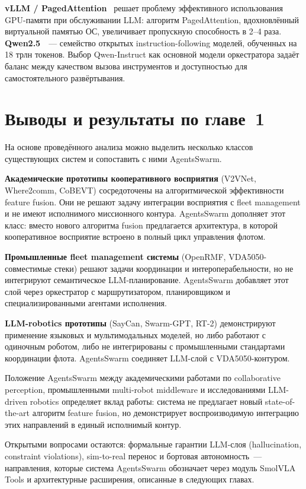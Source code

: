 \documentclass[14pt,a4paper]{extreport}
\begin{document}
\textbf{vLLM / PagedAttention}~\cite{kwon2023vllm} решает проблему эффективного использования GPU-памяти при обслуживании LLM: алгоритм PagedAttention, вдохновлённый виртуальной памятью ОС, увеличивает пропускную способность в 2--4 раза. \textbf{Qwen2.5}~\cite{qwen2025}~--- семейство открытых instruction-following моделей, обученных на 18 трлн токенов. Выбор Qwen-Instruct как основной модели оркестратора задаёт баланс между качеством вызова инструментов и доступностью для самостоятельного развёртывания.

\section{Выводы и результаты по главе~1}

На основе проведённого анализа можно выделить несколько классов существующих систем и сопоставить с ними AgentsSwarm.

\textbf{Академические прототипы кооперативного восприятия} (V2VNet, Where2comm, CoBEVT) сосредоточены на алгоритмической эффективности feature fusion. Они не решают задачу интеграции восприятия с fleet management и не имеют исполнимого миссионного контура. AgentsSwarm дополняет этот класс: вместо нового алгоритма fusion предлагается архитектура, в которой кооперативное восприятие встроено в полный цикл управления флотом.

\textbf{Промышленные fleet management системы} (OpenRMF, VDA5050-совместимые стеки) решают задачи координации и интероперабельности, но не интегрируют семантическое LLM-планирование. AgentsSwarm добавляет этот слой через оркестратор с маршрутизатором, планировщиком и специализированными агентами исполнения.

\textbf{LLM-robotics прототипы} (SayCan, Swarm-GPT, RT-2) демонстрируют применение языковых и мультимодальных моделей, но либо работают с одиночным роботом, либо не интегрированы с промышленными стандартами координации флота. AgentsSwarm соединяет LLM-слой с VDA5050-контуром.

Положение AgentsSwarm между академическими работами по collaborative perception, промышленными multi-robot middleware и исследованиями LLM-driven robotics определяет вклад работы: система не предлагает новый state-of-the-art алгоритм feature fusion, но демонстрирует воспроизводимую интеграцию этих направлений в единый исполнимый контур.

Открытыми вопросами остаются: формальные гарантии LLM-слоя (hallucination, constraint violations), sim-to-real перенос и бортовая автономность~--- направления, которые система AgentsSwarm обозначает через модуль SmolVLA Tools и архитектурные расширения, описанные в следующих главах.
\end{document}
